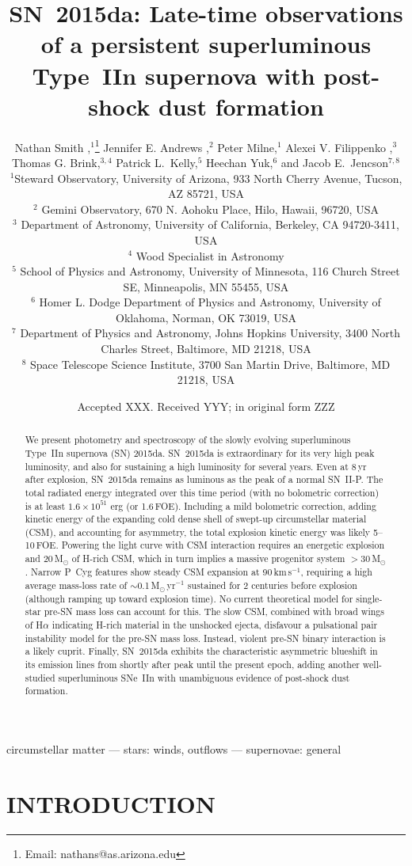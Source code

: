 \documentclass[fleqn,usenatbib,useAMS]{mnras}
\title[SN~2015da]{SN~2015da:  Late-time observations of a persistent superluminous Type~IIn supernova with post-shock dust formation}
\author[Smith et al.]{Nathan Smith \orcidlink{0000-0001-5510-2424},$^1$\thanks{Email:
    nathans@as.arizona.edu}  Jennifer E. Andrews \orcidlink{0000-0003-0123-0062},$^2$  Peter Milne,$^1$  Alexei V. Filippenko \orcidlink{0000-0003-3460-0103},$^{3}$ Thomas G. Brink\orcidlink{0000-0001-5955-2502},$^{3,4}$ \newauthor Patrick L.\ Kelly\orcidlink{0000-0003-3142-997X},$^{5}$ Heechan Yuk\orcidlink{0000-0002-7720-3418},$^{6}$ and Jacob E.\ Jencson\orcidlink{0000-0001-5754-4007}$^{7,8}$ \\  %
     $^1$Steward Observatory, University of Arizona, 933 North Cherry Avenue, Tucson, AZ 85721, USA \\ 
     $^2$ Gemini Observatory, 670 N. Aohoku Place, Hilo, Hawaii, 96720, USA \\  
    $^3$ Department of Astronomy, University of California, Berkeley, CA 94720-3411, USA \\
    $^4$ Wood Specialist in Astronomy \\
    $^5$ School of Physics and Astronomy, University of Minnesota, 116 Church Street SE, Minneapolis, MN 55455, USA \\ %
    $^6$ Homer L. Dodge Department of Physics and Astronomy, University of Oklahoma, Norman, OK 73019, USA \\
    $^7$ Department of Physics and Astronomy, Johns Hopkins University, 3400 North Charles Street, Baltimore, MD 21218, USA \\ 
    $^8$ Space Telescope Science Institute, 3700 San Martin Drive, Baltimore, MD 21218, USA
    }
\date{Accepted XXX. Received YYY; in original form ZZZ}
\begin{document}
\label{firstpage}
\pagerange{\pageref{firstpage}--\pageref{lastpage}}
\maketitle

\begin{abstract}
We present photometry and spectroscopy of the slowly evolving
superluminous Type~IIn supernova (SN) 2015da.  SN~2015da is
extraordinary for its very high peak luminosity, and also for
sustaining a high luminosity for several years. Even at 8\,yr after explosion, 
SN~2015da remains as luminous as the peak of a normal SN~II-P.  The total 
radiated energy integrated over this time period (with no bolometric
correction) is at least $1.6 \times 10^{51}$ erg (or 1.6\,FOE).  
Including a mild bolometric correction, adding 
kinetic energy of the expanding cold dense shell of swept-up circumstellar 
material (CSM), and accounting for asymmetry, the total explosion kinetic 
energy was likely 5--10\,FOE.  Powering the light curve with CSM
interaction requires an energetic explosion and 20\,M$_{\odot}$ of H-rich CSM, which
in turn implies a massive progenitor system $>$30\,M$_{\odot}$.
Narrow P~Cyg features show
steady CSM expansion at 90\,km\,s$^{-1}$, requiring a high average
mass-loss rate of $\sim$0.1\,M$_{\odot}$\,yr$^{-1}$ sustained for 2 centuries before
explosion (although ramping up toward explosion time).  No
current theoretical model for single-star pre-SN mass loss can account
for this. The slow CSM, combined with broad wings of H$\alpha$ indicating H-rich material in the unshocked ejecta, disfavour a pulsational pair instability model for the pre-SN mass loss.  Instead, violent pre-SN binary interaction is a likely cuprit.
Finally, SN~2015da exhibits the characteristic asymmetric
blueshift in its emission lines from shortly after peak until
the present epoch, adding another well-studied superluminous SNe~IIn
with unambiguous evidence of post-shock dust formation.
\end{abstract}


\begin{keywords}
  circumstellar matter --- stars: winds, outflows --- supernovae: general 
\end{keywords}




\section{INTRODUCTION}
\end{document}
